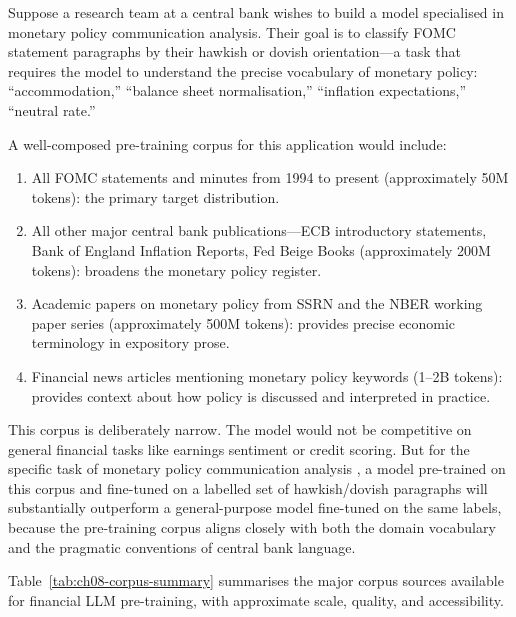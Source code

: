 \begin{example}
\label{ex:ch08-corpus-composition}
Suppose a research team at a central bank wishes to build a model specialised
in monetary policy communication analysis.  Their goal is to classify FOMC
statement paragraphs by their hawkish or dovish orientation---a task that
requires the model to understand the precise vocabulary of monetary policy:
``accommodation,'' ``balance sheet normalisation,'' ``inflation expectations,''
``neutral rate.''

A well-composed pre-training corpus for this application would include:
\begin{enumerate}
  \item All FOMC statements and minutes from 1994 to present (approximately
        50M tokens): the primary target distribution.
  \item All other major central bank publications---ECB introductory statements,
        Bank of England Inflation Reports, Fed Beige Books
        (approximately 200M tokens): broadens the monetary policy register.
  \item Academic papers on monetary policy from SSRN and the NBER working paper
        series (approximately 500M tokens): provides precise economic terminology
        in expository prose.
  \item Financial news articles mentioning monetary policy keywords (1--2B tokens):
        provides context about how policy is discussed and interpreted in practice.
\end{enumerate}
This corpus is deliberately narrow.  The model would not be competitive on general
financial tasks like earnings sentiment or credit scoring.  But for the specific
task of monetary policy communication analysis \cite{hansen2018transparency}, a
model pre-trained on this corpus and fine-tuned on a labelled set of hawkish/dovish
paragraphs will substantially outperform a general-purpose model fine-tuned on the
same labels, because the pre-training corpus aligns closely with both the domain
vocabulary and the pragmatic conventions of central bank language.
\end{example}

Table~\ref{tab:ch08-corpus-summary} summarises the major corpus sources available
for financial LLM pre-training, with approximate scale, quality, and accessibility.

